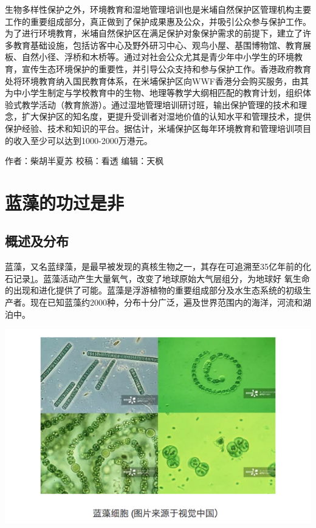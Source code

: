 \documentclass[
]{book}
\begin{document}
生物多样性保护之外，环境教育和湿地管理培训也是米埔自然保护区管理机构主要工作的重要组成部分，真正做到了保护成果惠及公众，并吸引公众参与保护工作。为了进行环境教育，米埔自然保护区在满足保护对象保护需求的前提下，建立了许多教育基础设施，包括访客中心及野外研习中心、观鸟小屋、基围博物馆、教育展板、自然小径、浮桥和木桥等。通过对社会公众尤其是青少年中小学生的环境教育，宣传生态环境保护的重要性，并引导公众支持和参与保护工作。香港政府教育处将环境教育纳入国民教育体系，在米埔保护区向WWF香港分会购买服务，由其为中小学生制定与学校教育中的生物、地理等教学大纲相匹配的教育计划，组织体验式教学活动（教育旅游）。通过湿地管理培训研讨班，输出保护管理的技术和理念，扩大保护区的知名度，更提升受训者对湿地价值的认知水平和管理技术，提供保护经验、技术和知识的平台。据估计，米埔保护区每年环境教育和管理培训项目的收入至少可以达到1000-2000万港元。

作者：柴胡半夏苏
校稿：看透
编辑：天枫

\hypertarget{ux84ddux85fbux7684ux529fux8fc7ux662fux975e}{%
\section{蓝藻的功过是非}\label{ux84ddux85fbux7684ux529fux8fc7ux662fux975e}}

\hypertarget{ux6982ux8ff0ux53caux5206ux5e03}{%
\subsection{概述及分布}\label{ux6982ux8ff0ux53caux5206ux5e03}}

蓝藻，又名蓝绿藻，是最早被发现的真核生物之一，其存在可追溯至35亿年前的化石记录\href{陈心想，耿增超。西北农林科技大学学报（自然科学版），2013，41:\%20167-174．}{1}。蓝藻活动产生大量氧气，改变了地球原始大气层组分，为地球好 氧生命的出现和进化提供了可能。蓝藻是浮游植物的重要组成部分及水生态系统的初级生产者。现在已知蓝藻约2000种，分布十分广泛，遍及世界范围内的海洋，河流和湖泊中。

\includegraphics[width=8.33in]{images/lanzao1}
\end{document}
